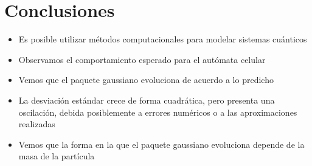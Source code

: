 \documentclass[12pts, letterpaper]{article}
\begin{document}
\section{Conclusiones}
\begin{itemize}
    \item Es posible utilizar métodos computacionales para modelar sistemas cuánticos
    \item Observamos el comportamiento esperado para el autómata celular
    \item Vemos que el paquete gaussiano evoluciona de acuerdo a lo predicho
    \item La desviación estándar crece de forma cuadrática, pero presenta una oscilación, 
    debida posiblemente a errores numéricos o a las aproximaciones realizadas
    \item Vemos que la forma en la que el paquete gaussiano evoluciona depende de la masa 
    de la partícula
\end{itemize}

\nocite{*}
\printbibliography
\end{document}
